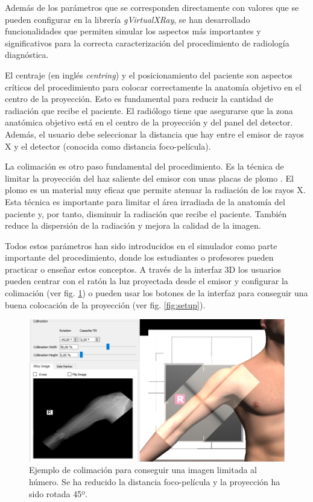 Además de los parámetros que se corresponden directamente con valores que se pueden configurar en la librería \emph{gVirtualXRay}, se han desarrollado funcionalidades que permiten simular los aspectos más importantes y significativos para la correcta caracterización del procedimiento de radiología diagnóstica. 

El centraje (en inglés \emph{centring}) y el posicionamiento del paciente son aspectos críticos del procedimiento para colocar correctamente la anatomía objetivo en el centro de la proyección. Esto es fundamental para reducir la cantidad de radiación que recibe el paciente. El radiólogo tiene que asegurarse que la zona anatómica objetivo está en el centro de la proyección y del panel del detector. Además, el usuario debe seleccionar la distancia que hay entre el emisor de rayos X y el detector (conocida como distancia foco-película).

La colimación es otro paso fundamental del procedimiento. Es la técnica de limitar la proyección del haz saliente del emisor con unas placas de plomo \cite{boomgaarden1991collimation}. El plomo es un material muy eficaz que permite atenuar la radiación de los rayos X. Esta técnica es importante para limitar el área irradiada de la anatomía del paciente y, por tanto,  disminuir la radiación que recibe el paciente. También reduce la dispersión de la radiación y mejora la calidad de la imagen.

Todos estos parámetros han sido introducidos en el simulador como parte importante del procedimiento, donde los estudiantes o profesores pueden practicar o enseñar estos conceptos. A través de la interfaz 3D los usuarios pueden centrar con el ratón la luz proyectada desde el emisor y configurar la colimación (ver fig. \ref{fig:collimation}) o pueden usar los botones de la interfaz para conseguir una buena colocación de la proyección (ver fig. \ref{fig:setup}).

\begin{figure}[tb]
\centering
\includegraphics[width=0.9\linewidth]{IMG/collimation.png}
\caption{\label{fig:collimation} Ejemplo de colimación para conseguir una imagen limitada al húmero. Se ha reducido la distancia foco-película y la proyección ha sido rotada  45º. }
\end{figure}

